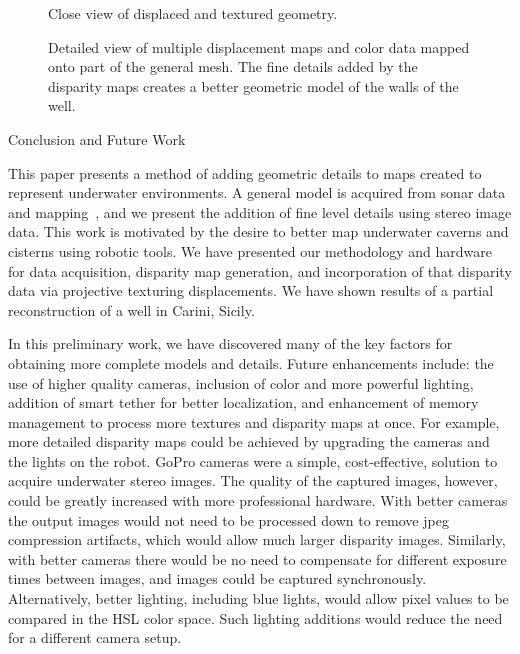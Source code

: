 \documentclass[twocolumn]{article}
\makeatletter
\def\section{\@startsection{section}{1}{\z@}{24pt plus 2 pt
minus 2 pt} {12pt plus 2pt minus 2pt}{\large\bf}}
\makeatother
\begin{document}
\begin{figure}[!h]
	\vspace{-0.2cm}
	\centering
	\caption{Close view of displaced and textured geometry.}
	\label{fig:result4}
\end{figure}

\begin{figure*}[!ht]
   \vspace{-0.2cm}
   \caption{Detailed view of multiple displacement maps and color data mapped onto part of the general mesh.  The fine details added by the disparity maps creates a better geometric model of the walls of the well.}
  \label{fig:resultFull}
 \end{figure*}

\section{Conclusion and Future Work}
\label{sec:conclusion}

\noindent 
This paper presents a method of adding geometric details to maps created to represent underwater environments. A general model is acquired from sonar data and mapping~\cite{ICEX11,McVicker,McVicker2}, and we present the addition of fine level details using stereo image data.  This work is motivated by the desire to better map underwater caverns and cisterns using robotic tools.  We have presented our methodology and hardware for data acquisition, disparity map generation, and incorporation of that disparity data via projective texturing displacements.  We have shown results of a partial reconstruction of a well in Carini, Sicily.

In this preliminary work, we have discovered many of the key factors for obtaining more complete models and details.  Future enhancements include: the use of higher quality cameras, inclusion of color and more powerful lighting, addition of smart tether for better localization, and enhancement of memory management to process more textures and disparity maps at once.
For example, more detailed disparity maps could be achieved by upgrading the cameras and the lights on the robot.
GoPro cameras were a simple, cost-effective, solution to acquire underwater stereo images.
The quality of the captured images, however, could be greatly increased with more professional hardware.
With better cameras the output images would not need to be processed down to remove jpeg compression artifacts, which would allow much larger disparity images.  
Similarly, with better cameras there would be no need to compensate for different exposure times between images, and images could be captured synchronously.
Alternatively, better lighting, including blue lights, would allow pixel values to be compared in the HSL color space.
Such lighting additions would reduce the need for a different camera setup.
\end{document}

